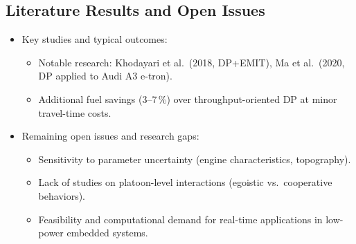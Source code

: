 \subsection{Literature Results and Open Issues}
\label{subsec:eco_dp_results_issues}
\begin{itemize}
    \item Key studies and typical outcomes:
    \begin{itemize}
        \item Notable research: Khodayari et al.\ (2018, DP+EMIT), Ma et al.\ (2020, DP applied to Audi A3 e-tron).
        \item Additional fuel savings (3–7\,\%) over throughput-oriented DP at minor travel-time costs.
    \end{itemize}
    \item Remaining open issues and research gaps:
    \begin{itemize}
        \item Sensitivity to parameter uncertainty (engine characteristics, topography).
        \item Lack of studies on platoon-level interactions (egoistic vs.\ cooperative behaviors).
        \item Feasibility and computational demand for real-time applications in low-power embedded systems.
    \end{itemize}
\end{itemize}
